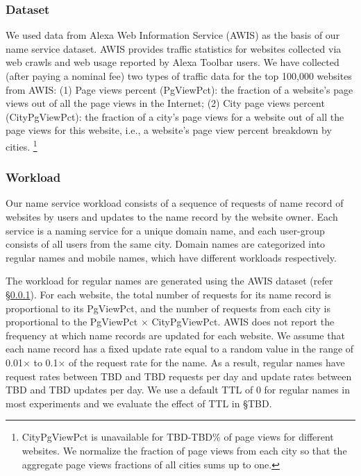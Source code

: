 \subsubsection{Dataset}
\label{subsubsec:dataset}

We used data from Alexa Web Information Service  (AWIS)  \cite{alexa} as the basis of our name service dataset. AWIS provides traffic statistics for websites collected via web crawls and web usage reported by Alexa Toolbar users.
We have collected (after paying a nominal fee) two types of traffic data for the top 100,000 websites from AWIS:  
(1) Page views percent (PgViewPct): the fraction of a website's page views out of all the page views in the Internet;
(2) City page views percent (CityPgViewPct): the fraction of a city's page views for a website out of all the page views for this website, i.e., a website's page view percent breakdown by cities.
\footnote{CityPgViewPct is unavailable for TBD-TBD\% of page views for different websites.
We normalize the fraction of page views from each city so that the aggregate page views fractions of all cities sums up to one.} 

\subsubsection{Workload}

Our name service workload consists of a sequence of requests  of name record of websites by users and updates to the name record by the website owner.
Each service is a naming service for a unique domain name, and each user-group consists of all users from the same city.
Domain names are categorized into regular names and mobile names, which have different workloads respectively.

The workload for regular names are generated using the AWIS dataset (refer \S \ref{subsubsec:dataset}). For each website, the total number of requests for its name record is proportional to its PgViewPct, and the number of requests from each city is proportional to the PgViewPct $\times$ CityPgViewPct.
AWIS does not report the frequency at which name records are updated for each website.
We assume that each name record has a fixed update rate equal to a random value in the range of 0.01$\times$ to 0.1$\times$ of the request rate for the name.  As a result, regular names have request rates between TBD and TBD requests per day and update rates between TBD and TBD updates per day.
We use a default TTL of 0 for regular names in most experiments and we evaluate the effect of TTL in \S TBD.

